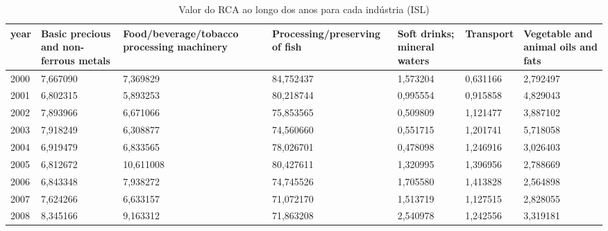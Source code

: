 \begin{table}
\centering
\caption{Valor do RCA ao longo dos anos para cada indústria (ISL)}
\begin{tabular}{p{1cm}p{2cm}p{2cm}p{2cm}p{2cm}p{2cm}p{2cm}}
\toprule
 year &  Basic precious and non-ferrous metals &  Food/beverage/tobacco processing machinery &  Processing/preserving of fish &  Soft drinks; mineral waters &  Transport &  Vegetable and animal oils and fats \\
\midrule
 2000 &                               7,667090 &                                    7,369829 &                      84,752437 &                     1,573204 &   0,631166 &                            2,792497 \\
 2001 &                               6,802315 &                                    5,893253 &                      80,218744 &                     0,995554 &   0,915858 &                            4,829043 \\
 2002 &                               7,893966 &                                    6,671066 &                      75,853565 &                     0,509809 &   1,121477 &                            3,887102 \\
 2003 &                               7,918249 &                                    6,308877 &                      74,560660 &                     0,551715 &   1,201741 &                            5,718058 \\
 2004 &                               6,919479 &                                    6,833565 &                      78,026701 &                     0,478098 &   1,246916 &                            3,026403 \\
 2005 &                               6,812672 &                                   10,611008 &                      80,427611 &                     1,320995 &   1,396956 &                            2,788669 \\
 2006 &                               6,843348 &                                    7,938272 &                      74,745526 &                     1,705580 &   1,413828 &                            2,564898 \\
 2007 &                               7,624266 &                                    6,633157 &                      71,072170 &                     1,513719 &   1,127515 &                            2,828055 \\
 2008 &                               8,345166 &                                    9,163312 &                      71,863208 &                     2,540978 &   1,242556 &                            3,319181 \\

\end{tabular}
\end{table}

